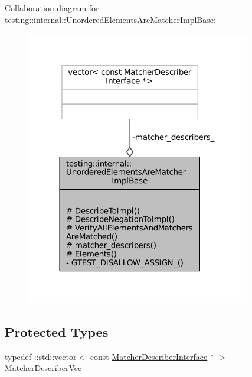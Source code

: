 Collaboration diagram for testing\+:\+:internal\+:\+:Unordered\+Elements\+Are\+Matcher\+Impl\+Base\+:
\nopagebreak
\begin{figure}[H]
\begin{center}
\leavevmode
\includegraphics[width=278pt]{classtesting_1_1internal_1_1UnorderedElementsAreMatcherImplBase__coll__graph}
\end{center}
\end{figure}
\subsection*{Protected Types}
\begin{DoxyCompactItemize}
\item 
typedef \+::std\+::vector$<$ const \hyperlink{classtesting_1_1MatcherDescriberInterface}{Matcher\+Describer\+Interface} $\ast$ $>$ \hyperlink{classtesting_1_1internal_1_1UnorderedElementsAreMatcherImplBase_a81ca7ce793d4b25ce2a7d3e28b48cd64}{Matcher\+Describer\+Vec}
\end{DoxyCompactItemize}
